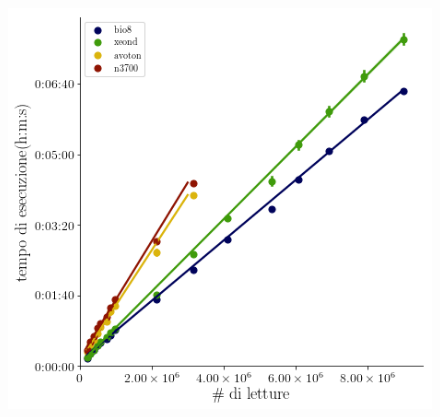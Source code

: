 \documentclass{beamer}
\begin{document}
\begin{frame}
\begin{columns}
\begin{column}{0.8\linewidth}	
\begin{figure}[H]
\centering
\includegraphics[scale=0.5]{sort_picard.png}
\label{subfig:SP}
\end{figure}
\end{column}
\end{columns}
\end{frame}
\end{document}
